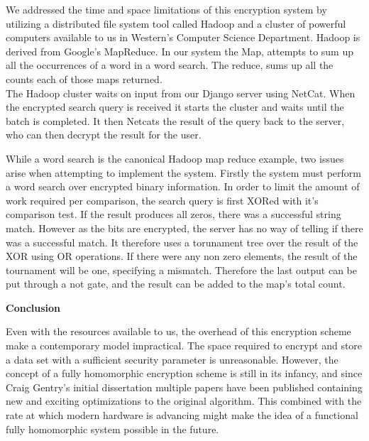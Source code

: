 \documentclass[11pt]{article}
\begin{document}
 We addressed the time and space limitations of this encryption system by utilizing a distributed file system tool called Hadoop and a cluster of powerful computers available to us in Western's Computer Science Department. Hadoop is derived from Google's MapReduce. In our system the Map, attempts to sum up all the occurrences of a word in a word search. The reduce, sums up all the counts each of those maps returned.\\

The Hadoop cluster waits on input from our Django server using NetCat. When the encrypted search query is received it starts the cluster and waits until the batch is completed. It then Netcats the result of the query back to the server, who can then decrypt the result for the user.

While a word search is the canonical Hadoop map reduce example, two issues arise when attempting to implement the system. Firstly the system must perform a word search over encrypted binary information. In order to limit the amount of work required per comparison, the search query is first XORed with it's comparison test. If the result produces all zeros, there was a successful string match. However as the bits are encrypted, the server has no way of telling if there was a successful match. It therefore uses a torunament tree over the result of the XOR using OR operations. If there were any non zero elements, the result of the tournament will be one, specifying a mismatch. Therefore the last output can be put through a not gate, and the result can be added to the map's total count.
\begin{center}
\textbf{Conclusion}
\end{center}

Even with the resources available to us, the overhead of this encryption scheme make a contemporary model impractical. The space required to encrypt and store a data set with a sufficient security parameter is unreasonable. However, the concept of a fully homomorphic encryption scheme is still in its infancy, and since Craig Gentry's initial dissertation multiple papers have been published containing new and exciting optimizations to the original algorithm. This combined with the rate at which modern hardware is advancing might make the idea of a functional fully homomorphic system possible in the future. \\ \\ \\
\end{document}
